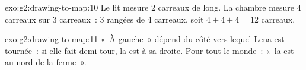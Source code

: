 \begin{solution}{exo:g2:drawing-to-map:10}
Le lit mesure 2 carreaux de long. La chambre mesure 4 carreaux sur
3 carreaux~: 3 rangées de 4 carreaux, soit $4 + 4 + 4 = 12$ carreaux.
\end{solution}

\begin{solution}{exo:g2:drawing-to-map:11}
«~À gauche~» dépend du côté vers lequel Lena est tournée~: si elle fait
demi-tour, la  est à sa droite. Pour tout le monde~: «~la 
est au nord de la ferme~».
\end{solution}
